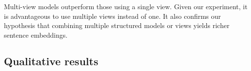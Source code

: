 Multi-view models outperform those using a single view. Given our experiment, it is advantageous to use multiple views instead of one. It also confirms our hypothesis that combining multiple structured models or views yields richer sentence embeddings.

\begin{table}[!htb]
\footnotesize
\caption{Impact of the multi-view. The first section corresponds to single-view setups for which $f$ and $g$ are the same views. The second section reports multi-view models. For each model, we report the average score on the SentEval benchmark.}
\label{table:multi-view}
\end{table}

\subsection{Qualitative results}

